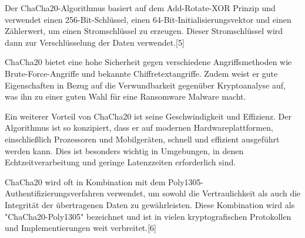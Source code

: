 \documentclass[12pt]{article}
\begin{document}
Der ChaCha20-Algorithmus basiert auf dem Add-Rotate-XOR Prinzip und verwendet einen 256-Bit-Schlüssel, einen 64-Bit-Initialisierungsvektor und einen Zählerwert, um einen Stromschlüssel zu erzeugen. Dieser Stromschlüssel wird dann zur Verschlüsselung der Daten verwendet.[5]

ChaCha20 bietet eine hohe Sicherheit gegen verschiedene Angriffsmethoden wie Brute-Force-Angriffe und bekannte Chiffretextangriffe. Zudem weist er gute Eigenschaften in Bezug auf die Verwundbarkeit gegenüber Kryptoanalyse auf, was ihn zu einer guten Wahl für eine Ransomware Malware macht.

Ein weiterer Vorteil von ChaCha20 ist seine Geschwindigkeit und Effizienz. Der Algorithmus ist so konzipiert, dass er auf modernen Hardwareplattformen, einschließlich Prozessoren und Mobilgeräten, schnell und effizient ausgeführt werden kann. Dies ist besonders wichtig in Umgebungen, in denen Echtzeitverarbeitung und geringe Latenzzeiten erforderlich sind.

ChaCha20 wird oft in Kombination mit dem Poly1305-Authentifizierungsverfahren verwendet, um sowohl die Vertraulichkeit als auch die Integrität der übertragenen Daten zu gewährleisten. Diese Kombination wird als "ChaCha20-Poly1305" bezeichnet und ist in vielen kryptografischen Protokollen und Implementierungen weit verbreitet.[6]
\end{document}
